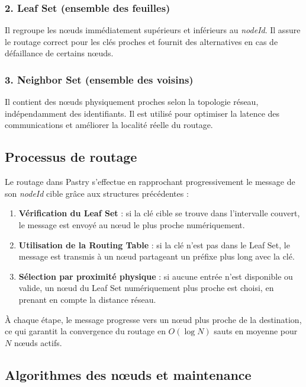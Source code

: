 \subsubsection{2. Leaf Set (ensemble des feuilles)}

Il regroupe les nœuds immédiatement supérieurs et inférieurs au \textit{nodeId}. Il assure le routage correct pour les clés proches et fournit des alternatives en cas de défaillance de certains nœuds.

\subsubsection{3. Neighbor Set (ensemble des voisins)}

Il contient des nœuds physiquement proches selon la topologie réseau, indépendamment des identifiants. Il est utilisé pour optimiser la latence des communications et améliorer la localité réelle du routage.

\subsection{Processus de routage}

Le routage dans Pastry s’effectue en rapprochant progressivement le message de son \textit{nodeId} cible grâce aux structures précédentes :

\begin{enumerate}
    \item \textbf{Vérification du Leaf Set} : si la clé cible se trouve dans l’intervalle couvert, le message est envoyé au nœud le plus proche numériquement.
    \item \textbf{Utilisation de la Routing Table} : si la clé n’est pas dans le Leaf Set, le message est transmis à un nœud partageant un préfixe plus long avec la clé.
    \item \textbf{Sélection par proximité physique} : si aucune entrée n’est disponible ou valide, un nœud du Leaf Set numériquement plus proche est choisi, en prenant en compte la distance réseau.
\end{enumerate}

À chaque étape, le message progresse vers un nœud plus proche de la destination, ce qui garantit la convergence du routage en $O(\log N)$ sauts en moyenne pour $N$ nœuds actifs.

\subsection{Algorithmes des nœuds et maintenance}

